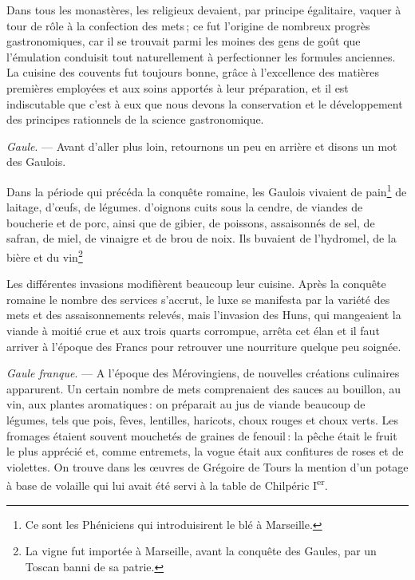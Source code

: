 Dans tous les monastères, les religieux devaient, par principe égalitaire,
vaquer à tour de rôle à la confection des mets ; ce fut l'origine de nombreux
progrès gastronomiques, car il se trouvait parmi les moines des gens de goût
que l'émulation conduisit tout naturellement à perfectionner les formules
anciennes. La cuisine des couvents fut toujours bonne, grâce à l'excellence des
matières premières employées et aux soins apportés à leur préparation, et il
est indiscutable que c'est à eux que nous devons la conservation et le
développement des principes rationnels de la science gastronomique.

\sk


\textit{Gaule}. — Avant d'aller plus loin, retournons un peu en arrière et
disons un mot des Gaulois.

Dans la période qui précéda la conquête romaine, les Gaulois vivaient de
pain\footnote{Ce sont les Phéniciens qui introduisirent le blé à Marseille.} de
laitage, d'œufs, de légumes. d'oignons cuits sous la cendre, de viandes de
boucherie et de porc, ainsi que de gibier, de poissons, assaisonnés de sel, de
safran, de miel, de vinaigre et de brou de noix. Ils buvaient de l'hydromel, de
la bière et du vin\footnote{La vigne fut importée à Marseille, avant la
conquête des Gaules, par un Toscan banni de sa patrie.}

Les différentes invasions modifièrent beaucoup leur cuisine. Après la conquête
romaine le nombre des services s'accrut, le luxe se manifesta par la variété
des mets et des assaisonnements relevés, mais l'invasion des Huns, qui
mangeaient la viande à moitié crue et aux trois quarts corrompue, arrêta cet
élan et il faut arriver à l'époque des Francs pour retrouver une nourriture
quelque peu soignée.

\sk

\textit{Gaule franque}. — A l’époque des Mérovingiens, de nouvelles créations
culinaires apparurent. Un certain nombre de mets comprenaient des sauces au
bouillon, au vin, aux plantes aromatiques : on préparait au jus de viande
beaucoup de légumes, tels que pois, fèves, lentilles, haricots, choux rouges et
choux verts. Les fromages étaient souvent mouchetés de graines de fenouil : la
pêche était le fruit le plus apprécié et, comme entremets, la vogue était aux
confitures de roses et de violettes. On trouve dans les œuvres de Grégoire de
Tours la mention d'un potage à base de volaille qui lui avait été servi à la
table de Chilpéric I\textsuperscript{er}.

